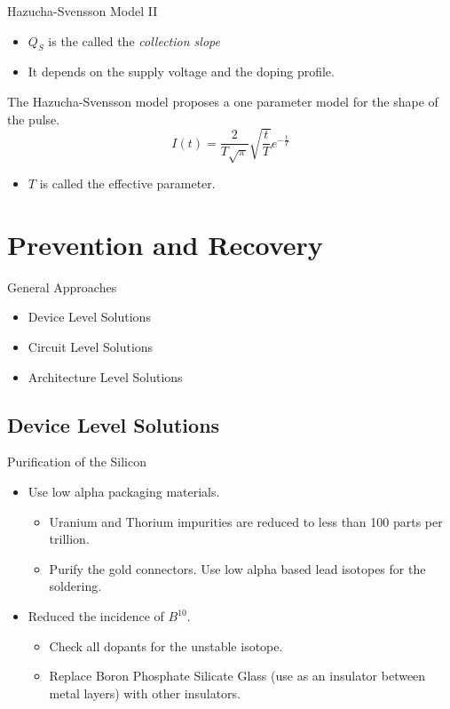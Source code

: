 \documentclass{beamer}
\begin{document}
\begin{frame}{Hazucha-Svensson Model II}
 \begin{itemize}
  \item $Q_S$ is the called the {\em collection slope}
  \item It depends on the supply voltage and the doping profile.
 \end{itemize}

The Hazucha-Svensson model proposes a one parameter model for the shape of the pulse.
\begin{equation*}
 I(t) = \frac{2}{T \sqrt{\pi}} \sqrt{\frac{t}{T}} e^{-\frac{t}{T}}
\end{equation*}

\begin{itemize}
 \item $T$ is called the effective parameter. 
\end{itemize}

\end{frame}

\section{Prevention and Recovery}
\begin{frame} {General Approaches}
 \begin{itemize}
  \item Device Level Solutions
  \item Circuit Level Solutions
  \item Architecture Level Solutions
 \end{itemize}

\end{frame}

\subsection{Device Level Solutions}
\begin{frame}{Purification of the Silicon}
  \begin{itemize}
   \item Use low alpha packaging materials.
      \begin{itemize}
	\item Uranium and Thorium impurities are reduced to less than 100 parts per trillion.
	 \item Purify the gold connectors. Use low alpha based lead isotopes for the soldering.
      \end{itemize}
\pause
    \item Reduced the incidence of $B^{10}$.
      \begin{itemize}
	\item Check all dopants for the unstable isotope.
	\item Replace Boron Phosphate Silicate Glass (use as an insulator between metal layers) with other insulators.
      \end{itemize}

  \end{itemize}

\end{frame}
\end{document}
